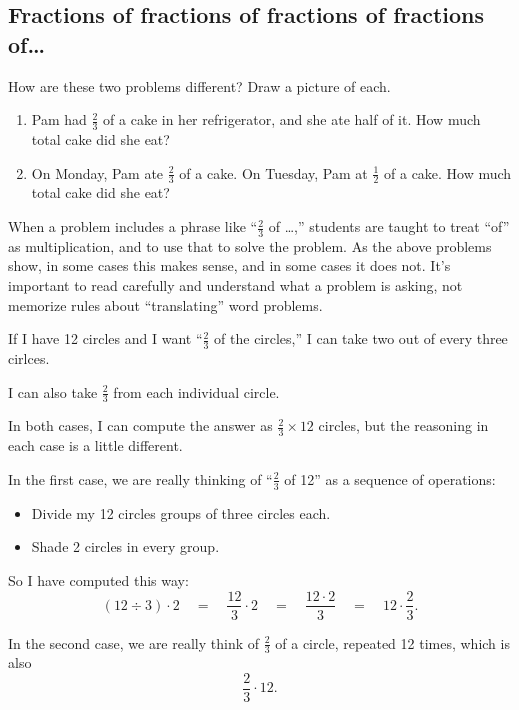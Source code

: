 \subsection{Fractions of fractions of fractions of fractions of\dots}
\begin{thinkpair*}
How are these two problems different?  Draw a picture of each.
\begin{enumerate}
\item
Pam had $\frac 2 3$ of a cake in her refrigerator, and she ate half of it.  How much total cake did she eat?
\item
On Monday, Pam ate $\frac 2 3$ of a cake.  On Tuesday, Pam at $\frac 1 2$ of a cake.  How much total cake did she eat?
\end{enumerate}
\end{thinkpair*}




When a problem includes a phrase like ``$\frac 2 3 $ of \dots,'' students are taught to treat ``of'' as multiplication, and to use that to solve the problem.  As the above problems show, in some cases this makes sense, and in some cases it does not.  It's important  to read carefully and understand what a problem is asking, not memorize rules about ``translating'' word problems.

If I have 12 circles and I want ``$\frac 2 3$ of the circles,'' I can take two out of every three cirlces.

  I can also take $\frac 2 3$ from each individual circle.  
  
  In both cases, I can compute the answer as 
 $\frac 2 3 \times 12$ circles, but the reasoning in each case is a little different.  
 
 In the first case, we are really thinking of ``$\frac 2 3$ of 12'' as a sequence of operations: 
 \begin{itemize}
 \item
 Divide my 12 circles groups of three circles each.  
 \item
 Shade 2 circles in every group.  
 \end{itemize}
 So I have computed this way:
 \[
 (12 \div 3) \cdot 2 
 \quad
 =
 \quad
 \frac{12}3 \cdot 2 
 \quad
 =
 \quad
 \frac{12\cdot 2}{3}
 \quad
 =
 \quad
 12 \cdot \frac 2 3.
 \]
 
 In the second case, we are really think of $\frac 2 3$ of a circle, repeated 12 times, which is also
 \[
 \frac 2 3 \cdot 12.
 \]


